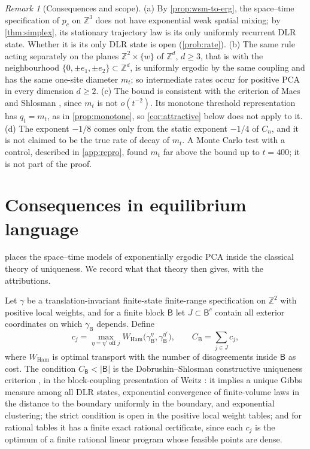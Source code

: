 \documentclass[11pt]{article}
\theoremstyle{plain}
\theoremstyle{definition}
\theoremstyle{remark}
\newtheorem{remark}[theorem]{Remark}
\newcommand{\Z}{\mathbb{Z}}
\begin{document}
\begin{remark}[Consequences and scope]
\label{rem:critical}
(a) By \cref{prop:wsm-to-erg}, the space--time specification of $p_c$ on $\Z^3$ does not have exponential weak spatial mixing; by \cref{thm:simplex}, its stationary trajectory law is its only uniformly recurrent DLR state. Whether it is its only DLR state is open (\cref{prob:rate}). (b) The same rule acting separately on the planes $\Z^2\times\{w\}$ of $\Z^d$, $d\ge3$, that is with the neighbourhood $\{0,\pm e_1,\pm e_2\}\subset\Z^d$, is uniformly ergodic by the same coupling and has the same one-site diameter $m_t$; so intermediate rates occur for positive PCA in every dimension $d\ge2$. (c) The bound is consistent with the criterion of Maes and Shlosman \cite[Corollary~2]{MS93}, since $m_t$ is not $o(t^{-2})$. Its monotone threshold representation has $q_t=m_t$, as in \cref{prop:monotone}, so \cref{cor:attractive} below does not apply to it. (d) The exponent $-1/8$ comes only from the static exponent $-1/4$ of $C_n$, and it is not claimed to be the true rate of decay of $m_t$. A Monte Carlo test with a control, described in \cref{app:repro}, found $m_t$ far above the bound up to $t=400$; it is not part of the proof.
\end{remark}

\section{Consequences in equilibrium language}
\label{sec:equilibrium}

 places the space--time models of exponentially ergodic PCA inside the classical theory of uniqueness. We record what that theory then gives, with the attributions.

Let $\gamma$ be a translation-invariant finite-state finite-range specification on $\Z^2$ with positive local weights, and for a finite block $\mathsf B$ let $J\subset\mathsf B^c$ contain all exterior coordinates on which $\gamma_{\mathsf B}$ depends. Define
\begin{equation}
c_j=\max_{\eta=\eta'\text{ off }j}W_{\mathrm{Ham}}\bigl(\gamma^\eta_{\mathsf B},\gamma^{\eta'}_{\mathsf B}\bigr),\qquad C_{\mathsf B}=\sum_{j\in J}c_j,
\label{eq:ds}
\end{equation}
where $W_{\mathrm{Ham}}$ is optimal transport with the number of disagreements inside $\mathsf B$ as cost. The condition $C_{\mathsf B}<|\mathsf B|$ is the Dobrushin--Shlosman constructive uniqueness criterion \cite{DS85}, in the block-coupling presentation of Weitz \cite{Weitz05}: it implies a unique Gibbs measure among all DLR states, exponential convergence of finite-volume laws in the distance to the boundary uniformly in the boundary, and exponential clustering; the strict condition is open in the positive local weight tables; and for rational tables it has a finite exact rational certificate, since each $c_j$ is the optimum of a finite rational linear program whose feasible points are dense.
\end{document}
